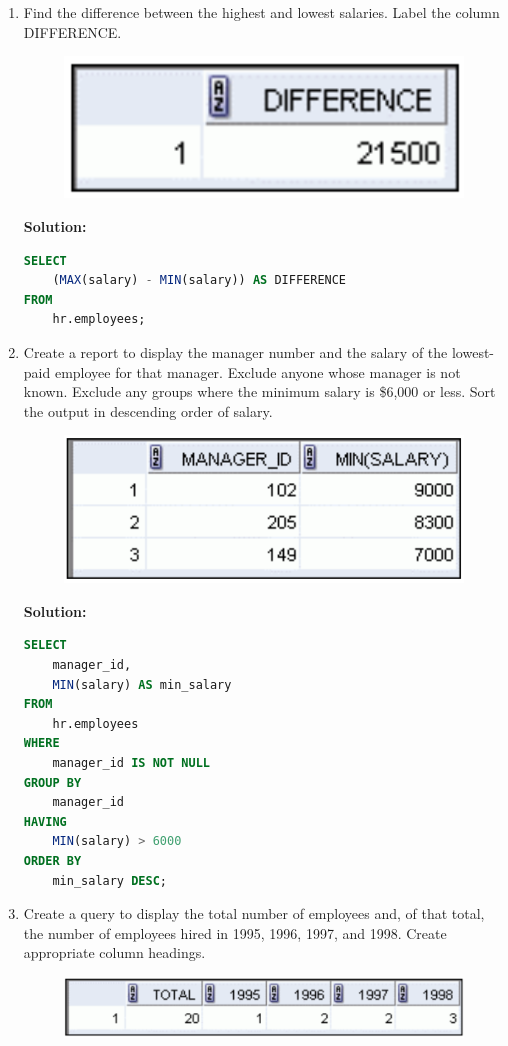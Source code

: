 \documentclass[a4paper,12pt]{article}
\begin{document}
\begin{enumerate}
\begin{lstlisting}[language=SQL]
    \end{lstlisting}
        \item Find the difference between the highest and lowest salaries. Label the column DIFFERENCE.
    \begin{figure}[h]
        \centering
        \includegraphics[width=.5\linewidth]{graphics/68.png}
    \end{figure}

    \textbf{Solution: }
    \begin{lstlisting}[language=SQL]
SELECT 
    (MAX(salary) - MIN(salary)) AS DIFFERENCE
FROM 
    hr.employees;
    \end{lstlisting}
        \item Create a report to display the manager number and the salary of the lowest-paid employee for
that manager. Exclude anyone whose manager is not known. Exclude any groups where the
minimum salary is \$6,000 or less. Sort the output in descending order of salary.
    \begin{figure}[h]
        \centering
        \includegraphics[width=.5\linewidth]{graphics/69.png}
    \end{figure}

    \textbf{Solution: }
    \begin{lstlisting}[language=SQL]
SELECT 
    manager_id,
    MIN(salary) AS min_salary
FROM 
    hr.employees
WHERE 
    manager_id IS NOT NULL
GROUP BY 
    manager_id
HAVING 
    MIN(salary) > 6000
ORDER BY 
    min_salary DESC;
    \end{lstlisting}
    \item Create a query to display the total number of employees and, of that total, the number of
employees hired in 1995, 1996, 1997, and 1998. Create appropriate column headings.
    \begin{figure}[h]
        \centering
        \includegraphics[width=.5\linewidth]{graphics/610.png}
    \end{figure}


\end{enumerate}
\end{document}
